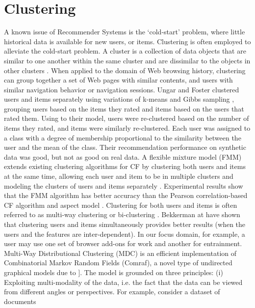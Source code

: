\documentclass[11pt,oneside]{book}
\let\Oldsection\section
\renewcommand{\section}{\FloatBarrier\Oldsection}
\begin{document}
\section{Clustering}

A known issue of Recommender Systems is the `cold-start' problem,
where little historical data is available for new users, or
items. Clustering is often employed to alleviate the cold-start
problem. A cluster is a collection of data objects that are similar to
one another within the same cluster and are dissimilar to the objects
in other clusters \citep{han2006data}. When applied to the domain of Web browsing
history, clustering can group together a set of Web pages with similar
contents, and users with similar navigation behavior or navigation
sessions. Ungar and Foster \citep{ungar1998clustering} clustered users and items separately
using variations of k-means and Gibbs sampling \citep{geman1984stochastic}, grouping users
based on the items they rated and items based on the users that rated
them. Using to their model, users were re-clustered based on the
number of items they rated, and items were similarly
re-clustered. Each user was assigned to a class with a degree of
membership proportional to the similarity between the user and the
mean of the class. Their recommendation performance on synthetic data
was good, but not as good on real data. A flexible mixture model (FMM)
extends existing clustering algorithms for CF by clustering both users
and items at the same time, allowing each user and item to be in
multiple clusters and modeling the clusters of users and items
separately \citep{si03}. Experimental results show that the FMM algorithm has
better accuracy than the Pearson correlation-based CF algorithm and
aspect model \citep{hofmann2004latent}. Clustering for both users and items is often
referred to as multi-way clustering \citep{bekkerman05} or bi-clustering \citep{zhu2009analyzing}.
Bekkerman at \citep{bekkerman05} have shown that clustering users and items
simultaneously provides better results (when the users and the
features are inter-dependent). In our focus domain, for example, a
user may use one set of browser add-ons for work and another for
entrainment. Multi-Way Distributional Clustering (MDC) is an efficient
implementation of Combinatorial Markov Random Fields (Comraf), a novel
type of undirected graphical models due to \citep{bekkerman2006semi}]. The
model is grounded on three principles: (i) Exploiting multi-modality
of the data, i.e. the fact that the data can be viewed from different
angles or perspectives. For example, consider a dataset of documents
\end{document}
